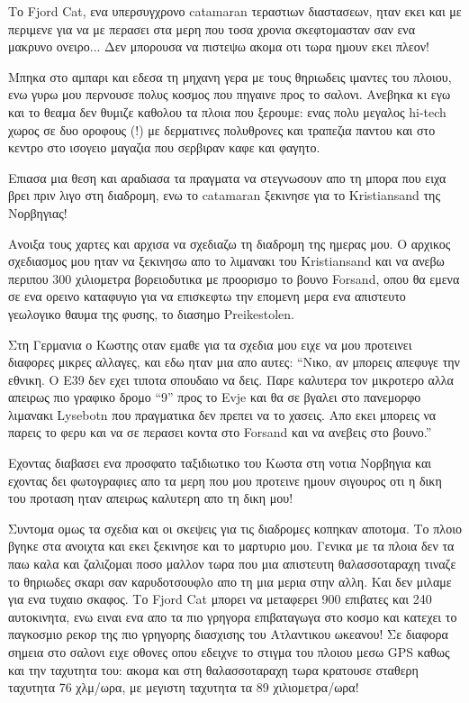 
Το Fjord Cat, ενα υπερσυγχρονο catamaran τεραστιων διαστασεων, ηταν εκει και με περιμενε για να με περασει στα μερη που τοσα χρονια σκεφτομασταν σαν ενα μακρυνο ονειρο... Δεν μπορουσα να πιστεψω ακομα οτι τωρα ημουν εκει πλεον!


Μπηκα στο αμπαρι και εδεσα τη μηχανη γερα με τους θηριωδεις ιμαντες του πλοιου, ενω γυρω μου περνουσε πολυς κοσμος που πηγαινε προς το σαλονι. Ανεβηκα κι εγω και το θεαμα δεν θυμιζε καθολου τα πλοια που ξερουμε: ενας πολυ μεγαλος hi-tech χωρος σε δυο οροφους (!) με δερματινες πολυθρονες και τραπεζια παντου και στο κεντρο στο ισογειο μαγαζια που σερβιραν καφε και φαγητο.


Επιασα μια θεση και αραδιασα τα πραγματα να στεγνωσουν απο τη μπορα που ειχα βρει πριν λιγο στη διαδρομη, ενω το catamaran ξεκινησε για το Kristiansand της Νορβηγιας! 

Ανοιξα τους χαρτες και αρχισα να σχεδιαζω τη διαδρομη της ημερας μου. Ο αρχικος σχεδιασμος μου ηταν να ξεκινησω απο το λιμανακι του Kristiansand και να ανεβω περιπου 300 χιλιομετρα βορειοδυτικα με προορισμο το βουνο Forsand, οπου θα εμενα σε ενα ορεινο καταφυγιο για να επισκεφτω την επομενη μερα ενα απιστευτο γεωλογικο θαυμα της φυσης, το διασημο Preikestolen. 

Στη Γερμανια ο Κωστης οταν εμαθε για τα σχεδια μου ειχε να μου προτεινει διαφορες μικρες αλλαγες, και εδω ηταν μια απο αυτες: ``Νικο, αν μπορεις απεφυγε την εθνικη. Ο Ε39 δεν εχει τιποτα σπουδαιο να δεις. Παρε καλυτερα τον μικροτερο αλλα απειρως πιο γραφικο δρομο ``9'' προς το Evje και θα σε βγαλει στο πανεμορφο λιμανακι Lysebotn που πραγματικα δεν πρεπει να το χασεις. Απο εκει μπορεις να παρεις το φερυ και να σε περασει κοντα στο Forsand και να ανεβεις στο βουνο.''

Εχοντας διαβασει ενα προσφατο ταξιδιωτικο του Κωστα στη νοτια Νορβηγια και εχοντας δει φωτογραφιες απο τα μερη που μου προτεινε ημουν σιγουρος οτι η δικη του προταση ηταν απειρως καλυτερη απο τη δικη μου!


Συντομα ομως τα σχεδια και οι σκεψεις για τις διαδρομες κοπηκαν αποτομα. Το πλοιο βγηκε στα ανοιχτα και εκει ξεκινησε και το μαρτυριο μου. Γενικα με τα πλοια δεν τα παω καλα και ζαλιζομαι ποσο μαλλον τωρα που μια απιστευτη θαλασσοταραχη τιναζε το θηριωδες σκαρι σαν καρυδοτσουφλο απο τη μια μερια στην αλλη. 
Και δεν μιλαμε για ενα τυχαιο σκαφος. Το Fjord Cat μπορει να μεταφερει 900 επιβατες και 240 αυτοκινητα, ενω ειναι ενα απο τα πιο γρηγορα επιβαταγωγα στο κοσμο και κατεχει το παγκοσμιο ρεκορ της πιο γρηγορης διασχισης του Ατλαντικου ωκεανου!
Σε διαφορα σημεια στο σαλονι ειχε οθονες οπου εδειχνε το στιγμα του πλοιου μεσω GPS καθως και την ταχυτητα του: ακομα και στη θαλασσοταραχη τωρα κρατουσε σταθερη ταχυτητα 76 χλμ/ωρα, με μεγιστη ταχυτητα τα 89 χιλιομετρα/ωρα!

